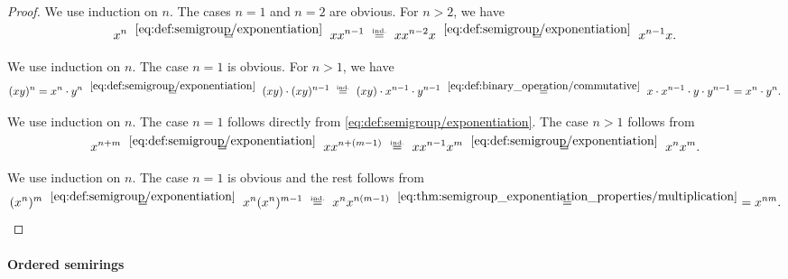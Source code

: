 \begin{proof}
   We use induction on \( n \). The cases \( n = 1 \) and \( n = 2 \) are obvious. For \( n > 2 \), we have
  \begin{equation*}
    x^n
    \reloset {\eqref{eq:def:semigroup/exponentiation}} =
    x x^{n-1}
    \reloset {\T{ind.}} =
    x x^{n-2} x
    \reloset {\eqref{eq:def:semigroup/exponentiation}} =
    x^{n-1} x.
  \end{equation*}

   We use induction on \( n \). The case \( n = 1 \) is obvious. For \( n > 1 \), we have
  \begin{equation*}
    (xy)^n = x^n \cdot y^n
    \reloset {\eqref{eq:def:semigroup/exponentiation}} =
    (xy) \cdot (xy)^{n-1}
    \reloset {\T{ind.}} =
    (xy) \cdot x^{n-1} \cdot y^{n-1}
    \reloset {\eqref{eq:def:binary_operation/commutative}} =
    x \cdot x^{n-1} \cdot y \cdot y^{n-1}
    =
    x^n \cdot y^n.
  \end{equation*}

   We use induction on \( n \). The case \( n = 1 \) follows directly from \eqref{eq:def:semigroup/exponentiation}. The case \( n > 1 \) follows from
  \begin{equation*}
    x^{n + m}
    \reloset {\eqref{eq:def:semigroup/exponentiation}} =
    x x^{n + (m - 1)}
    \reloset {\T{ind.}} =
    x x^{n-1} x^m
    \reloset {\eqref{eq:def:semigroup/exponentiation}} =
    x^n x^m.
  \end{equation*}

   We use induction on \( n \). The case \( n = 1 \) is obvious and the rest follows from
  \begin{equation*}
    (x^n)^m
    \reloset {\eqref{eq:def:semigroup/exponentiation}} =
    x^n (x^n)^{m-1}
    \reloset {\T{ind.}} =
    x^n x^{n (m - 1)}
    \reloset {\eqref{eq:thm:semigroup_exponentiation_properties/multiplication}} =
    =
    x^{nm}.
  \end{equation*}
\end{proof}

\paragraph{Ordered semirings}


